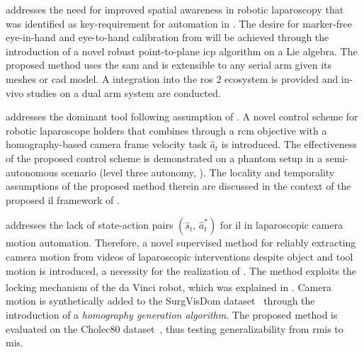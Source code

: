 \textbf{} addresses the need for improved spatial awareness in robotic laparoscopy that was identified as key-requirement for automation in . The desire for marker-free eye-in-hand and eye-to-hand calibration from  will be achieved through the introduction of a novel robust point-to-plane \gls{icp} algorithm on a Lie algebra. The proposed method uses the \gls{sam} \cite{Kirillov:arxiv:2023} and is extensible to any serial arm given its meshes or \gls{cad} model. A integration into the \gls{ros} 2 ecosystem is provided and in-vivo studies on a dual arm system are conducted.

\textbf{} addresses the dominant tool following assumption of . A novel control scheme for robotic laparoscope holders that combines  through a \gls{rcm} objective with a homography-based camera frame velocity task $\hat{a}_t$ is introduced. The effectiveness of the proposed control scheme is demonstrated on a phantom setup in a semi-autonomous scenario (level three autonomy, ). The locality and temporality assumptions of the proposed method therein are discussed in the context of the proposed \gls{il} framework of .

\textbf{} addresses the lack of state-action pairs $(\hat{s}_t,\,\hat{a}^*_t)$ for \gls{il} in laparoscopic camera motion automation. Therefore, a novel supervised method for reliably extracting camera motion from videos of laparoscopic interventions despite object and tool motion is introduced, a necessity for the realization of . The method exploits the locking mechanism of the da Vinci\textsuperscript{\textregistered} robot, which was explained in . Camera motion is synthetically added to the SurgVisDom dataset~\cite{zia2021surgical} through the introduction of a \textit{homography generation algorithm}. The proposed method is evaluated on the Cholec80 dataset~\cite{twinanda2016endonet}, thus testing generalizability from \gls{rmis} to \gls{mis}.

